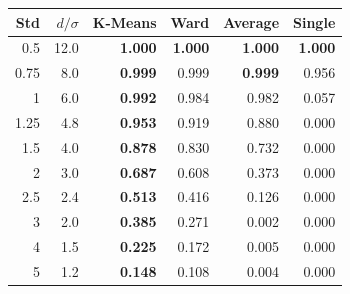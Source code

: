 \begin{tabular}{rrrrrr}
\toprule
\textbf{Std} & \textbf{$d/\sigma$} & \textbf{K-Means} & \textbf{Ward} & \textbf{Average} & \textbf{Single} \\
\midrule
0.5 & 12.0 & \textbf{1.000} & \textbf{1.000} & \textbf{1.000} & \textbf{1.000} \\
0.75 & 8.0 & \textbf{0.999} & 0.999 & \textbf{0.999} & 0.956 \\
1 & 6.0 & \textbf{0.992} & 0.984 & 0.982 & 0.057 \\
1.25 & 4.8 & \textbf{0.953} & 0.919 & 0.880 & 0.000 \\
1.5 & 4.0 & \textbf{0.878} & 0.830 & 0.732 & 0.000 \\
2 & 3.0 & \textbf{0.687} & 0.608 & 0.373 & 0.000 \\
2.5 & 2.4 & \textbf{0.513} & 0.416 & 0.126 & 0.000 \\
3 & 2.0 & \textbf{0.385} & 0.271 & 0.002 & 0.000 \\
4 & 1.5 & \textbf{0.225} & 0.172 & 0.005 & 0.000 \\
5 & 1.2 & \textbf{0.148} & 0.108 & 0.004 & 0.000 \\
\bottomrule
\end{tabular}
